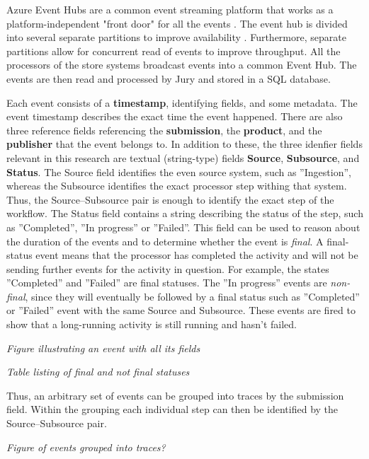 \documentclass[english,12pt,a4paper,pdftex,sci,utf8]{aaltothesis}
\theoremstyle{definition}
\newcommand{\nyi}[1]{\noindent\colorbox{nyibg}{\textcolor{nyitext}{\emph{#1}}}}
\begin{document}
Azure Event Hubs are a common event streaming platform that works as a platform-independent "front door" for all the events \cite{eventhubs}. 
The event hub is divided into several separate partitions to improve availability \cite{eventhubavail}.
Furthermore, separate partitions allow for concurrent read of events to improve throughput.
All the processors of the store systems broadcast events into a common Event Hub.
The events are then read and processed by Jury and stored in a SQL database.

Each event consists of a \textbf{timestamp}, identifying fields, and some metadata. The event timestamp describes the exact time the event happened. There are also three reference fields referencing the \textbf{submission}, the \textbf{product}, and the \textbf{publisher} that the event belongs to. In addition to these, the three idenfier fields relevant in this research are textual (string-type) fields \textbf{Source}, \textbf{Subsource}, and \textbf{Status}. The Source field identifies the even source system, such as ''Ingestion'', whereas the Subsource identifies the exact processor step withing that system. Thus, the Source--Subsource pair is enough to identify the exact step of the workflow. The Status field contains a string describing the status of the step, such as ''Completed'', ''In progress'' or ''Failed''. This field can be used to reason about the duration of the events and to determine whether the event is \emph{final}. 
A final-status event means that the processor has completed the activity and will not be sending further events for the activity in question.
For example, the states ''Completed'' and ''Failed'' are final statuses.
The ''In progress'' events are \emph{non-final}, since they will eventually be followed by a final status such as ''Completed'' or ''Failed'' event with the same Source and Subsource.
These events are fired to show that a long-running activity is still running and hasn't failed.

\nyi{Figure illustrating an event with all its fields}

\nyi{Table listing of final and not final statuses}

Thus, an arbitrary set of events can be grouped into traces by the submission field. Within the grouping each individual step can then be identified by the Source--Subsource pair.

\nyi{Figure of events grouped into traces?}
\end{document}
